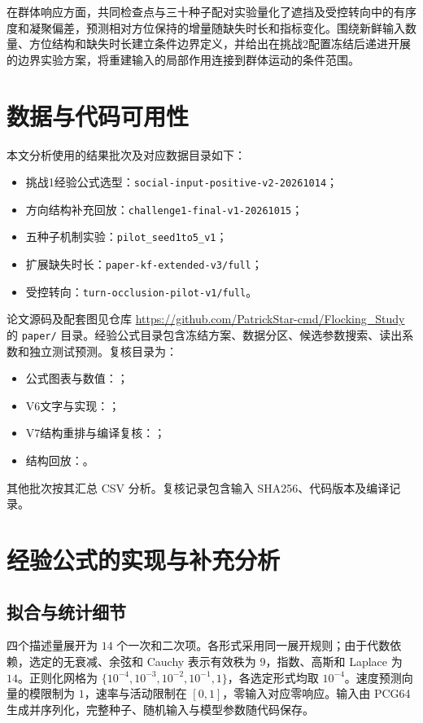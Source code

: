 \documentclass[UTF8,fontset=windows,11pt]{ctexart}
\begin{document}
在群体响应方面，共同检查点与三十种子配对实验量化了遮挡及受控转向中的有序度和凝聚偏差，预测相对方位保持的增量随缺失时长和指标变化。围绕新鲜输入数量、方位结构和缺失时长建立条件边界定义，并给出在挑战2配置冻结后递进开展的边界实验方案，将重建输入的局部作用连接到群体运动的条件范围。

\section*{数据与代码可用性}
本文分析使用的结果批次及对应数据目录如下：
\begin{itemize}[nosep,leftmargin=2em]
\item 挑战1经验公式选型：\texttt{social-input-positive-v2-20261014}；
\item 方向结构补充回放：\texttt{challenge1-final-v1-20261015}；
\item 五种子机制实验：\texttt{pilot\_seed1to5\_v1}；
\item 扩展缺失时长：\texttt{paper-kf-extended-v3/full}；
\item 受控转向：\texttt{turn-occlusion-pilot-v1/full}。
\end{itemize}
论文源码及配套图见仓库 \url{https://github.com/PatrickStar-cmd/Flocking_Study} 的 \texttt{paper/} 目录。经验公式目录包含冻结方案、数据分区、候选参数搜索、读出系数和独立测试预测。复核目录为：
\begin{itemize}[nosep,leftmargin=2em]
\item 公式图表与数值：；
\item V6文字与实现：；
\item V7结构重排与编译复核：；
\item 结构回放：。
\end{itemize}
其他批次按其汇总 CSV 分析。复核记录包含输入 SHA256、代码版本及编译记录。

\appendix
\section{经验公式的实现与补充分析}
\subsection{拟合与统计细节}\label{app:empirical_details}
四个描述量展开为 $14$ 个一次和二次项。各形式采用同一展开规则；由于代数依赖，选定的无衰减、余弦和 Cauchy 表示有效秩为 $9$，指数、高斯和 Laplace 为 $14$。正则化网格为 $\{10^{-4},10^{-3},10^{-2},10^{-1},1\}$，各选定形式均取 $10^{-4}$。速度预测向量的模限制为 $1$，速率与活动限制在 $[0,1]$，零输入对应零响应。输入由 PCG64 生成并序列化，完整种子、随机输入与模型参数随代码保存。
\end{document}
